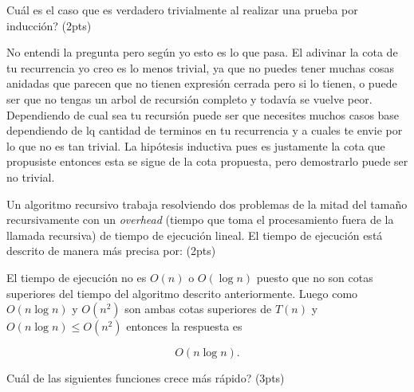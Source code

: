 \documentclass[answers,11pt]{exam}
\begin{document}
\begin{questions}

\question
\textquestiondown Cu\'al es el caso que es verdadero trivialmente al realizar una prueba por inducci\'on? (2pts)

\begin{choices}
\end{choices}

No entendi la pregunta pero según yo esto es lo que pasa. El adivinar la cota de tu recurrencia yo creo es lo menos trivial, ya que no puedes tener muchas cosas anidadas que parecen que no tienen expresión cerrada pero si lo tienen, o puede ser que no tengas un arbol de recursión completo y todavía se vuelve peor. Dependiendo de cual sea tu recursión puede ser que necesites muchos casos base dependiendo de lq cantidad de terminos en tu recurrencia y a cuales te envie por lo que no es tan trivial. La hipótesis inductiva pues es justamente la cota que propusiste entonces esta se sigue de la cota propuesta, pero demostrarlo puede ser no trivial.

\question
Un algoritmo recursivo trabaja resolviendo dos problemas de la mitad del tama\~no recursivamente con un {\it overhead} (tiempo que toma el procesamiento fuera de la llamada recursiva) de tiempo de ejecuci\'on lineal. El tiempo de ejecuci\'on est\'a descrito de manera m\'as precisa por: (2pts)

\begin{oneparchoices}
\end{oneparchoices}

El tiempo de ejecución no es $O(n)$ o $O(\log n)$ puesto que no son cotas superiores del tiempo del algoritmo descrito anteriormente. Luego como $O(n\log n)$ y $O(n^2)$ son ambas cotas superiores de $T(n)$ y $O(n\log n) \leq O(n^2)$ entonces la respuesta es

\[O(n\log n).\]

\question
\textquestiondown Cu\'al de las siguientes funciones crece m\'as r\'apido? (3pts)

\begin{oneparchoices}
\end{oneparchoices}


\end{questions}
\end{document}
